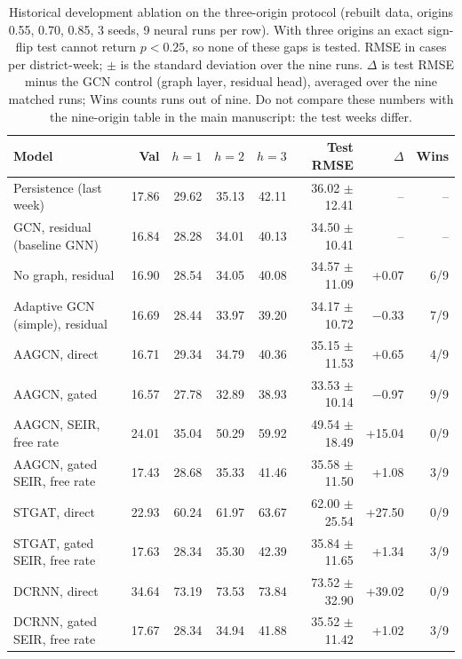 \begin{table}[t]
\centering
\caption{Historical development ablation on the three-origin protocol (rebuilt data, origins 0.55, 0.70, 0.85, 3 seeds, 9 neural runs per row). With three origins an exact sign-flip test cannot return $p<0.25$, so none of these gaps is tested. RMSE in cases per district-week; $\pm$ is the standard deviation over the nine runs. $\Delta$ is test RMSE minus the GCN control (graph layer, residual head), averaged over the nine matched runs; Wins counts runs out of nine. Do not compare these numbers with the nine-origin table in the main manuscript: the test weeks differ.}
\label{tab:p3}
\footnotesize
\setlength{\tabcolsep}{4pt}
\begin{tabular}{@{}lrrrrrrr@{}}
\toprule
Model & Val & $h{=}1$ & $h{=}2$ & $h{=}3$ & Test RMSE & $\Delta$ & Wins \\
\midrule
Persistence (last week) & 17.86 & 29.62 & 35.13 & 42.11 & 36.02 $\pm$ 12.41 & -- & -- \\ %
\midrule
GCN, residual (baseline GNN) & 16.84 & 28.28 & 34.01 & 40.13 & 34.50 $\pm$ 10.41 & -- & -- \\ %
No graph, residual & 16.90 & 28.54 & 34.05 & 40.08 & 34.57 $\pm$ 11.09 & +0.07 & 6/9 \\ %
Adaptive GCN (simple), residual & 16.69 & 28.44 & 33.97 & 39.20 & 34.17 $\pm$ 10.72 & $-$0.33 & 7/9 \\ %
\midrule
AAGCN, direct & 16.71 & 29.34 & 34.79 & 40.36 & 35.15 $\pm$ 11.53 & +0.65 & 4/9 \\ %
AAGCN, gated & 16.57 & 27.78 & 32.89 & 38.93 & 33.53 $\pm$ 10.14 & $-$0.97 & 9/9 \\ %
AAGCN, SEIR, free rate & 24.01 & 35.04 & 50.29 & 59.92 & 49.54 $\pm$ 18.49 & +15.04 & 0/9 \\ %
AAGCN, gated SEIR, free rate & 17.43 & 28.68 & 35.33 & 41.46 & 35.58 $\pm$ 11.50 & +1.08 & 3/9 \\ %
STGAT, direct & 22.93 & 60.24 & 61.97 & 63.67 & 62.00 $\pm$ 25.54 & +27.50 & 0/9 \\ %
STGAT, gated SEIR, free rate & 17.63 & 28.34 & 35.30 & 42.39 & 35.84 $\pm$ 11.65 & +1.34 & 3/9 \\ %
DCRNN, direct & 34.64 & 73.19 & 73.53 & 73.84 & 73.52 $\pm$ 32.90 & +39.02 & 0/9 \\ %
DCRNN, gated SEIR, free rate & 17.67 & 28.34 & 34.94 & 41.88 & 35.52 $\pm$ 11.42 & +1.02 & 3/9 \\ %
\bottomrule
\end{tabular}
\end{table}
